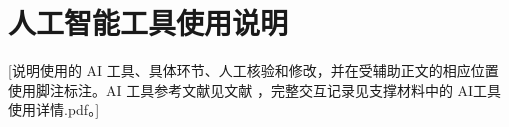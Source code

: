 \section*{人工智能工具使用说明}

[说明使用的 AI 工具、具体环节、人工核验和修改，并在受辅助正文的相应位置使用脚注标注。AI 工具参考文献见文献 \cite{ai-tool}，完整交互记录见支撑材料中的 AI工具使用详情.pdf。]
